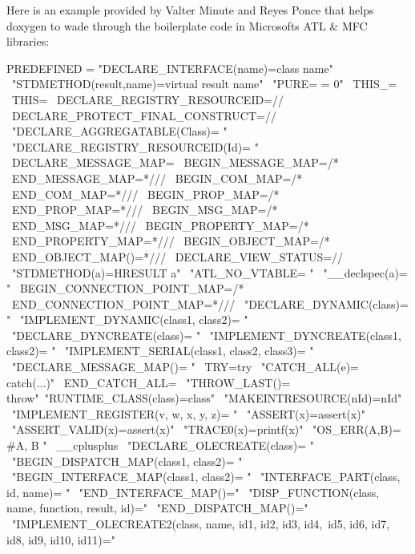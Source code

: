 Here is an example provided by Valter Minute and Reyes Ponce that helps doxygen to wade through the boilerplate code in Microsoft\textquotesingle{}s A\+TL \& M\+FC libraries\+:

\begin{DoxyVerb}PREDEFINED           = "DECLARE_INTERFACE(name)=class name" \
                       "STDMETHOD(result,name)=virtual result name" \
                       "PURE= = 0" \
                       THIS_= \
                       THIS= \
                       DECLARE_REGISTRY_RESOURCEID=// \
                       DECLARE_PROTECT_FINAL_CONSTRUCT=// \
                       "DECLARE_AGGREGATABLE(Class)= " \
                       "DECLARE_REGISTRY_RESOURCEID(Id)= " \
                       DECLARE_MESSAGE_MAP= \
                       BEGIN_MESSAGE_MAP=/* \
                       END_MESSAGE_MAP=*/// \
                       BEGIN_COM_MAP=/* \
                       END_COM_MAP=*/// \
                       BEGIN_PROP_MAP=/* \
                       END_PROP_MAP=*/// \
                       BEGIN_MSG_MAP=/* \
                       END_MSG_MAP=*/// \
                       BEGIN_PROPERTY_MAP=/* \
                       END_PROPERTY_MAP=*/// \
                       BEGIN_OBJECT_MAP=/* \
                       END_OBJECT_MAP()=*/// \
                       DECLARE_VIEW_STATUS=// \
                       "STDMETHOD(a)=HRESULT a" \
                       "ATL_NO_VTABLE= " \
                       "__declspec(a)= " \
                       BEGIN_CONNECTION_POINT_MAP=/* \
                       END_CONNECTION_POINT_MAP=*/// \
                       "DECLARE_DYNAMIC(class)= " \
                       "IMPLEMENT_DYNAMIC(class1, class2)= " \
                       "DECLARE_DYNCREATE(class)= " \
                       "IMPLEMENT_DYNCREATE(class1, class2)= " \
                       "IMPLEMENT_SERIAL(class1, class2, class3)= " \
                       "DECLARE_MESSAGE_MAP()= " \
                       TRY=try \
                       "CATCH_ALL(e)= catch(...)" \
                       END_CATCH_ALL= \
                       "THROW_LAST()= throw"\
                       "RUNTIME_CLASS(class)=class" \
                       "MAKEINTRESOURCE(nId)=nId" \
                       "IMPLEMENT_REGISTER(v, w, x, y, z)= " \
                       "ASSERT(x)=assert(x)" \
                       "ASSERT_VALID(x)=assert(x)" \
                       "TRACE0(x)=printf(x)" \
                       "OS_ERR(A,B)={ #A, B }" \
                       __cplusplus \
                       "DECLARE_OLECREATE(class)= " \
                       "BEGIN_DISPATCH_MAP(class1, class2)= " \
                       "BEGIN_INTERFACE_MAP(class1, class2)= " \
                       "INTERFACE_PART(class, id, name)= " \
                       "END_INTERFACE_MAP()=" \
                       "DISP_FUNCTION(class, name, function, result, id)=" \
                       "END_DISPATCH_MAP()=" \
                       "IMPLEMENT_OLECREATE2(class, name, id1, id2, id3, id4,\
                        id5, id6, id7, id8, id9, id10, id11)="
\end{DoxyVerb}


